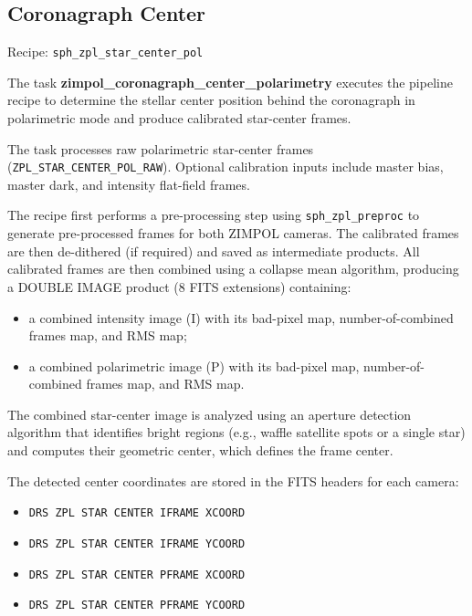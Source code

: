 \subsection{Coronagraph Center}

Recipe: \texttt{sph\_zpl\_star\_center\_pol}

The task \textbf{zimpol\_coronagraph\_center\_polarimetry} executes the pipeline recipe
to determine the stellar center position behind the coronagraph in polarimetric mode
and produce calibrated star-center frames.

The task processes raw polarimetric star-center frames (\texttt{ZPL\_STAR\_CENTER\_POL\_RAW}).
Optional calibration inputs include master bias, master dark, and intensity flat-field frames.

The recipe first performs a pre-processing step using
\texttt{sph\_zpl\_preproc}
to generate pre-processed frames for both ZIMPOL cameras.
The calibrated frames are then de-dithered (if required) and saved as intermediate products.
All calibrated frames are then combined using a collapse mean algorithm,
producing a DOUBLE IMAGE product (8 FITS extensions) containing:

\begin{itemize}
\item a combined intensity image (I) with its bad-pixel map, number-of-combined frames map, and RMS map;
\item a combined polarimetric image (P) with its bad-pixel map, number-of-combined frames map, and RMS map.
\end{itemize}

The combined star-center image is analyzed using an aperture detection algorithm
that identifies bright regions (e.g., waffle satellite spots or a single star)
and computes their geometric center, which defines the frame center.

The detected center coordinates are stored in the FITS headers for each camera:

\begin{itemize}
\item \texttt{DRS ZPL STAR CENTER IFRAME XCOORD}
\item \texttt{DRS ZPL STAR CENTER IFRAME YCOORD}
\item \texttt{DRS ZPL STAR CENTER PFRAME XCOORD}
\item \texttt{DRS ZPL STAR CENTER PFRAME YCOORD}
\end{itemize}

